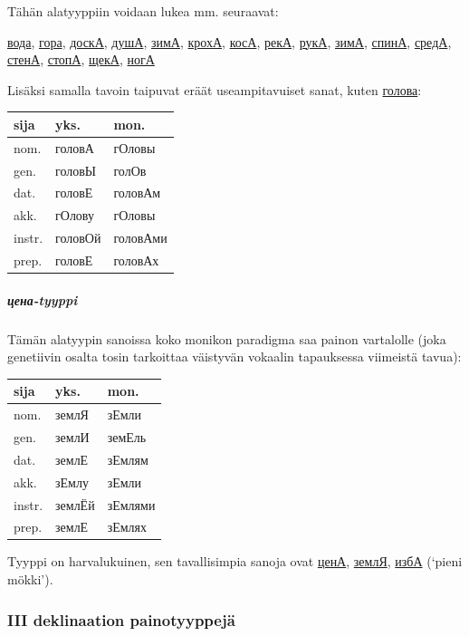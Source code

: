 \documentclass[]{scrartcl}
\begin{document}
Tähän alatyyppiin voidaan lukea mm. seuraavat:

\href{http://ru.wiktionary.org/wiki/вода}{вода},
\href{http://ru.wiktionary.org/wiki/гора}{гора},
\href{http://ru.wiktionary.org/wiki/доска}{доскА},
\href{http://ru.wiktionary.org/wiki/душа}{душА},
\href{http://ru.wiktionary.org/wiki/зима}{зимА},
\href{http://ru.wiktionary.org/wiki/кроха}{крохА},
\href{http://ru.wiktionary.org/wiki/коса}{косА},
\href{http://ru.wiktionary.org/wiki/река}{рекА},
\href{http://ru.wiktionary.org/wiki/рука}{рукА},
\href{http://ru.wiktionary.org/wiki/зима}{зимА},
\href{http://ru.wiktionary.org/wiki/спина}{спинА},
\href{http://ru.wiktionary.org/wiki/среда}{средА},
\href{http://ru.wiktionary.org/wiki/стена}{стенА},
\href{http://ru.wiktionary.org/wiki/стопа}{стопА},
\href{http://ru.wiktionary.org/wiki/щека}{щекА},
\href{http://ru.wiktionary.org/wiki/нога}{ногА}

Lisäksi samalla tavoin taipuvat eräät useampitavuiset sanat, kuten
\href{http://ru.wiktionary.org/wiki/голова}{голова}:

\begin{longtable}[c]{@{}lll@{}}
\toprule
sija & yks. & mon.\tabularnewline
\midrule
\endhead
nom. & головА & гОловы\tabularnewline
gen. & головЫ & голОв\tabularnewline
dat. & головЕ & головАм\tabularnewline
akk. & гОлову & гОловы\tabularnewline
instr. & головОй & головАми\tabularnewline
prep. & головЕ & головАх\tabularnewline
\bottomrule
\end{longtable}

\subparagraph{цена-tyyppi}\label{ux446ux435ux43dux430-tyyppi}

Tämän alatyypin sanoissa koko monikon paradigma saa painon vartalolle
(joka genetiivin osalta tosin tarkoittaa väistyvän vokaalin tapauksessa
viimeistä tavua):

\begin{longtable}[c]{@{}lll@{}}
\toprule
sija & yks. & mon.\tabularnewline
\midrule
\endhead
nom. & землЯ & зЕмли\tabularnewline
gen. & землИ & земЕль\tabularnewline
dat. & землЕ & зЕмлям\tabularnewline
akk. & зЕмлу & зЕмли\tabularnewline
instr. & землЁй & зЕмлями\tabularnewline
prep. & землЕ & зЕмлях\tabularnewline
\bottomrule
\end{longtable}

Tyyppi on harvalukuinen, sen tavallisimpia sanoja ovat
\href{http://ru.wiktionary.org/wiki/цена}{ценА},
\href{http://ru.wiktionary.org/wiki/земля}{землЯ},
\href{http://ru.wiktionary.org/wiki/изба}{избА} (`pieni mökki').

\subsubsection{III deklinaation
painotyyppejä}\label{iii-deklinaation-painotyyppejuxe4}
\end{document}
